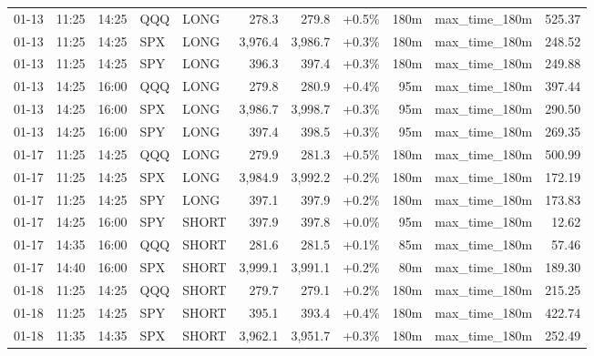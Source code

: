 \documentclass[11pt,a4paper,twoside]{article}
\begin{document}
\begin{center}
\begin{longtable}{>{\color{txtmain}}l l l l l r r r r >{\color{txtmain}}l r}
01-13 & 11:25 & 14:25 & QQQ & LONG & 278.3 & 279.8 & \textcolor{wingreen}{+0.5\%} & 180m & max\_time\_180m & \textcolor{wingreen}{525.37} \\
01-13 & 11:25 & 14:25 & SPX & LONG & 3,976.4 & 3,986.7 & \textcolor{wingreen}{+0.3\%} & 180m & max\_time\_180m & \textcolor{wingreen}{248.52} \\
01-13 & 11:25 & 14:25 & SPY & LONG & 396.3 & 397.4 & \textcolor{wingreen}{+0.3\%} & 180m & max\_time\_180m & \textcolor{wingreen}{249.88} \\
01-13 & 14:25 & 16:00 & QQQ & LONG & 279.8 & 280.9 & \textcolor{wingreen}{+0.4\%} & 95m & max\_time\_180m & \textcolor{wingreen}{397.44} \\
01-13 & 14:25 & 16:00 & SPX & LONG & 3,986.7 & 3,998.7 & \textcolor{wingreen}{+0.3\%} & 95m & max\_time\_180m & \textcolor{wingreen}{290.50} \\
01-13 & 14:25 & 16:00 & SPY & LONG & 397.4 & 398.5 & \textcolor{wingreen}{+0.3\%} & 95m & max\_time\_180m & \textcolor{wingreen}{269.35} \\
01-17 & 11:25 & 14:25 & QQQ & LONG & 279.9 & 281.3 & \textcolor{wingreen}{+0.5\%} & 180m & max\_time\_180m & \textcolor{wingreen}{500.99} \\
01-17 & 11:25 & 14:25 & SPX & LONG & 3,984.9 & 3,992.2 & \textcolor{wingreen}{+0.2\%} & 180m & max\_time\_180m & \textcolor{wingreen}{172.19} \\
01-17 & 11:25 & 14:25 & SPY & LONG & 397.1 & 397.9 & \textcolor{wingreen}{+0.2\%} & 180m & max\_time\_180m & \textcolor{wingreen}{173.83} \\
01-17 & 14:25 & 16:00 & SPY & SHORT & 397.9 & 397.8 & \textcolor{wingreen}{+0.0\%} & 95m & max\_time\_180m & \textcolor{wingreen}{12.62} \\
01-17 & 14:35 & 16:00 & QQQ & SHORT & 281.6 & 281.5 & \textcolor{wingreen}{+0.1\%} & 85m & max\_time\_180m & \textcolor{wingreen}{57.46} \\
01-17 & 14:40 & 16:00 & SPX & SHORT & 3,999.1 & 3,991.1 & \textcolor{wingreen}{+0.2\%} & 80m & max\_time\_180m & \textcolor{wingreen}{189.30} \\
01-18 & 11:25 & 14:25 & QQQ & SHORT & 279.7 & 279.1 & \textcolor{wingreen}{+0.2\%} & 180m & max\_time\_180m & \textcolor{wingreen}{215.25} \\
01-18 & 11:25 & 14:25 & SPY & SHORT & 395.1 & 393.4 & \textcolor{wingreen}{+0.4\%} & 180m & max\_time\_180m & \textcolor{wingreen}{422.74} \\
01-18 & 11:35 & 14:35 & SPX & SHORT & 3,962.1 & 3,951.7 & \textcolor{wingreen}{+0.3\%} & 180m & max\_time\_180m & \textcolor{wingreen}{252.49} \\

\end{longtable}
\end{center}
\end{document}
